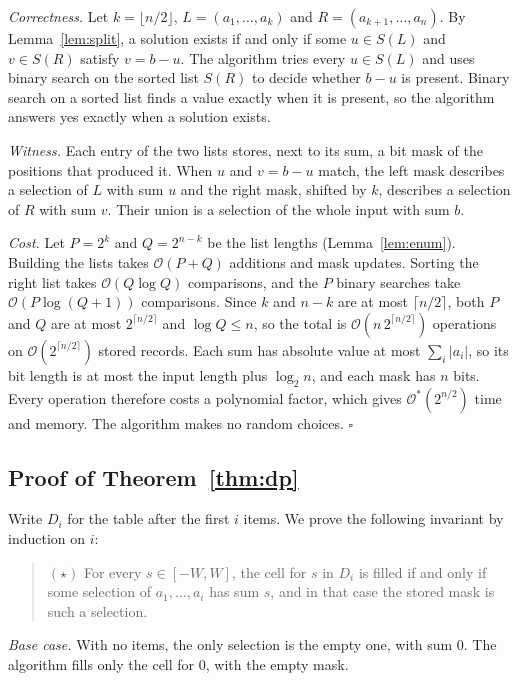 \documentclass[conference]{IEEEtran}
\newcommand{\Oh}{\mathcal{O}}
\begin{document}
\emph{Correctness.} Let $k=\lfloor n/2\rfloor$, $L=(a_1,\dots,a_k)$ and
$R=(a_{k+1},\dots,a_n)$. By Lemma~\ref{lem:split}, a solution exists if and
only if some $u\in S(L)$ and $v\in S(R)$ satisfy $v=b-u$. The algorithm tries
every $u\in S(L)$ and uses binary search on the sorted list $S(R)$ to decide
whether $b-u$ is present. Binary search on a sorted list finds a value exactly
when it is present, so the algorithm answers yes exactly when a solution
exists.

\emph{Witness.} Each entry of the two lists stores, next to its sum, a bit mask
of the positions that produced it. When $u$ and $v=b-u$ match, the left mask
describes a selection of $L$ with sum $u$ and the right mask, shifted by $k$,
describes a selection of $R$ with sum $v$. Their union is a selection of the
whole input with sum $b$.

\emph{Cost.} Let $P=2^k$ and $Q=2^{n-k}$ be the list lengths
(Lemma~\ref{lem:enum}). Building the lists takes $\Oh(P+Q)$ additions and mask
updates. Sorting the right list takes $\Oh(Q\log Q)$ comparisons, and the $P$
binary searches take $\Oh(P\log(Q+1))$ comparisons. Since $k$ and $n-k$ are at
most $\lceil n/2\rceil$, both $P$ and $Q$ are at most $2^{\lceil n/2\rceil}$ and
$\log Q\le n$, so the total is $\Oh(n\,2^{\lceil n/2\rceil})$ operations on
$\Oh(2^{\lceil n/2\rceil})$ stored records. Each sum has absolute value at most
$\sum_i|a_i|$, so its bit length is at most the input length plus $\log_2 n$,
and each mask has $n$ bits. Every operation therefore costs a
polynomial factor, which gives $\Oh^*(2^{n/2})$ time and memory. The algorithm
makes no random choices. \hfill$\square$

\subsection{Proof of Theorem~\ref{thm:dp}}
Write $D_i$ for the table after the first $i$ items. We prove the following
invariant by induction on $i$:

\begin{quote}
$(\star)$ For every $s\in[-W,W]$, the cell for $s$ in $D_i$ is filled if and
only if some selection of $a_1,\dots,a_i$ has sum $s$, and in that case the
stored mask is such a selection.
\end{quote}

\emph{Base case.} With no items, the only selection is the empty one, with sum
$0$. The algorithm fills only the cell for $0$, with the empty mask.
\end{document}
